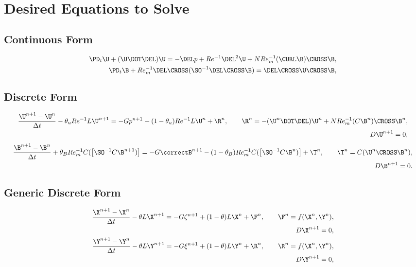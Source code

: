 \documentclass[11pt]{article}
\newcommand{\ReInv}{Re^{-1}}
\newcommand{\RemInv}{Re_m^{-1}}
\newcommand{\Al}{N Re_m^{-1}}
\begin{document}
\doublespacing

\section{Desired Equations to Solve}
\subsection{Continuous Form}
\begin{equation}\begin{aligned}
  \PD_t \U + (\U \DOT \DEL) \U
  = - \DEL p + \ReInv \DEL^2 \U + \Al
  (\CURL \B) \CROSS \B, \\
  \PD_t \B + \RemInv \DEL \CROSS ( \SO^{-1} \DEL \CROSS \B ) = \DEL \CROSS \U \CROSS \B,
\end{aligned}\end{equation}

\subsection{Discrete Form}
\begin{equation}\begin{aligned}
\frac{\U^{n+1}-\U^n}{\Delta t} - \theta_u \ReInv L\U^{n+1} = - G p^{n+1} + (1-\theta_u) \ReInv L\U^n + \R^n, \qquad \R^n = - (\U^n \DOT \DEL) \U^n + \Al (C\B^n) \CROSS \B^n, \\
 D \U^{n+1} = 0, \\
\end{aligned}\end{equation}
\begin{equation}\begin{aligned}
\frac{\B^{n+1}-\B^n}{\Delta t} + \theta_B \RemInv C (\left[ \SO^{-1} C\B^{n+1}) \right] = - G\correctB^{n+1} - (1-\theta_B) \RemInv C (\left[ \SO^{-1} C\B^n) \right] + \T^n, \qquad \T^n = C (\U^n \CROSS \B^n), \\
 D \B^{n+1} = 0. \\
\end{aligned}\end{equation}

\newpage
\subsection{Generic Discrete Form}
\begin{equation}\begin{aligned}
\frac{\X^{n+1}-\X^n}{\Delta t} - \theta L\X^{n+1} = - G \zeta^{n+1} + (1-\theta) L\X^n + \F^n, \qquad \F^n = f(\X^n,\Y^n), \\
 D \X^{n+1} = 0, \\
\frac{\Y^{n+1}-\Y^n}{\Delta t} - \theta L\Y^{n+1} = - G \xi^{n+1} + (1-\theta) L\Y^n + \R^n, \qquad \R^n = f(\X^n,\Y^n), \\
 D \Y^{n+1} = 0, \\
\end{aligned}\end{equation}
\end{document}
